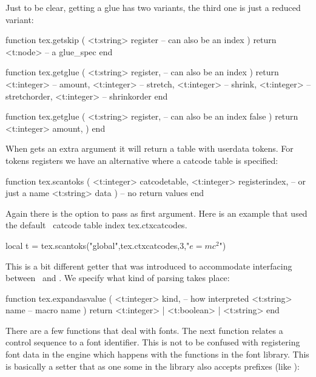 Just to be clear, getting a glue has two variants, the third one is just a reduced variant:

\starttyping[option=LUA]
function tex.getskip (
    <t:string> register -- can also be an index
)
    return <t:node> -- a glue_spec
end

function tex.getglue (
    <t:string>  register, -- can also be an index
)
    return
        <t:integer> -- amount,
        <t:integer> -- stretch,
        <t:integer> -- shrink,
        <t:integer> -- stretchorder,
        <t:integer> -- shrinkorder
end

function tex.getglue (
    <t:string> register, -- can also be an index
    false
)
    return <t:integer> amount,
)
end
\stoptyping

When  gets an extra argument  it will return a
table with userdata tokens. For tokens registers we have an alternative where a
catcode table is specified:

\starttyping[option=LUA]
function tex.scantoks (
    <t:integer> catcodetable,
    <t:integer> registerindex, -- or just a name
    <t:string>  data
)
    -- no return values
end
\stoptyping

Again there is the option to pass  as first argument. Here is an
example that used the default \CONTEXT\ catcode table index \typ
{tex.ctxcatcodes}.

\starttyping[option=LUA]
local t = tex.scantoks("global",tex.ctxcatcodes,3,"$e=mc^2$")
\stoptyping

This is a bit different getter that was introduced to accommodate interfacing
between \TEX\ and \METAPOST. We specify what kind of parsing takes place:

\starttyping[option=LUA]
function tex.expandasvalue (
    <t:integer> kind, -- how interpreted
    <t:string>  name  -- macro name
)
    return <t:integer> | <t:boolean> | <t:string>
end
\stoptyping

\startcolumns[n=4]
\stopcolumns

\stopsubsection

\startsubsection[title=Fonts]

There are a few functions that deal with fonts. The next function relates a
control sequence to a font identifier. This is not to be confused with
registering font data in the engine which happens with the functions in the \type
{font} library. This is basically a setter that as one some in the 
library also accepts prefixes (like ):

